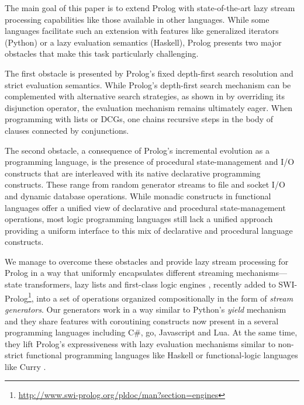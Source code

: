 \documentclass[submission,copyright,creativecommons]{eptcs}
\begin{document}
The main goal of this paper is to extend Prolog with state-of-the-art lazy
stream processing capabilities like those available in other languages.
While some languages facilitate such an extension with features like
generalized iterators (Python) or a lazy evaluation semantics (Haskell), 
Prolog presents two major obstacles that make this task particularly challenging.

The first obstacle is presented by Prolog's fixed depth-first search resolution
and strict evaluation semantics. While Prolog's depth-first search mechanism
can be complemented with alternative search strategies, as shown in \cite{tor}
by overriding its disjunction operator, the evaluation mechanism remains
ultimately eager. When programming with lists or DCGs, one chains recursive
steps in the body of clauses connected by conjunctions. 

The second obstacle, a consequence of Prolog's incremental evolution as a
programming language, is the presence of procedural state-management and I/O
constructs that are interleaved with its native declarative programming
constructs. These range from random generator streams to file and socket I/O
and dynamic database operations.  While monadic constructs in functional
languages \cite{moggi:monads,wadler93:cont}  offer  a unified view of
declarative and procedural state-management operations, most logic programming
languages still lack a unified approach providing a uniform interface to this
mix of declarative and procedural language constructs.

 
We manage to overcome these obstacles and provide lazy stream
processing for Prolog in a way that uniformly encapsulates
different streaming mechanisms---state transformers, lazy lists and first-class logic engines 
\cite{tarau:cl2000,padl09inter,bp2011}, 
recently added to SWI-Prolog\footnote{
\url{http://www.swi-prolog.org/pldoc/man?section=engines}}, into a set of operations organized compositionally in the form of {\em 
stream generators}.
Our generators work in a way similar to Python's {\em yield} mechanism \cite{pyref,beazley09} and 
they share features with coroutining constructs now present in a several  programming languages including C\#, go, Javascript and Lua. At the same time, 
they lift Prolog's expressiveness with lazy evaluation mechanisms similar to non-strict
functional programming languages like Haskell \cite{hudak07} or functional-logic languages like Curry \cite{antoy05}.
\end{document}
